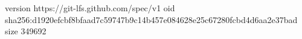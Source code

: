 version https://git-lfs.github.com/spec/v1
oid sha256:d1920efcbf8bfaad7c59747b9c14b457e084628e25c67280fcbd4d6aa2e37bad
size 349692
